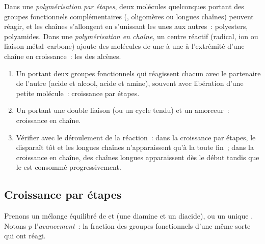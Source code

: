 \begin{definition}\label{def:b2:polymer-synthesis:step-chain}
Dans une \emph{polymérisation par étapes}, deux
molécules quelconques portant des groupes fonctionnels complémentaires (, oligomères ou longues
chaînes) peuvent réagir, et les chaînes s'allongent en s'unissant les unes aux autres~: polyesters,
polyamides. Dans une \emph{polymérisation en chaîne},
un centre réactif (radical, ion ou liaison métal--carbone) ajoute des molécules de  une à une à
l'extrémité d'une chaîne en croissance~: les  des alcènes.
\end{definition}

\begin{method}\label{met:b2:polymer-synthesis:classify}
\begin{enumerate}
  \item Un  portant deux groupes fonctionnels qui réagissent chacun avec le partenaire de l'autre
        (acide et alcool, acide et amine), souvent avec libération d'une petite molécule~: croissance par étapes.
  \item Un  portant une double liaison  (ou un cycle tendu) et un amorceur~: croissance en chaîne.
  \item Vérifier avec le déroulement de la réaction~: dans la croissance par étapes, le  disparaît
        tôt et les longues chaînes n'apparaissent qu'à la toute fin~; dans la croissance en chaîne, des
        chaînes longues apparaissent dès le début tandis que le  est consommé progressivement.
\end{enumerate}
\end{method}

\subsection*{Croissance par étapes}

Prenons un mélange équilibré de   et  (une diamine et un diacide), ou un
 unique . Notons $p$ l'\emph{avancement}~: la fraction des groupes fonctionnels d'une
même sorte qui ont réagi.

